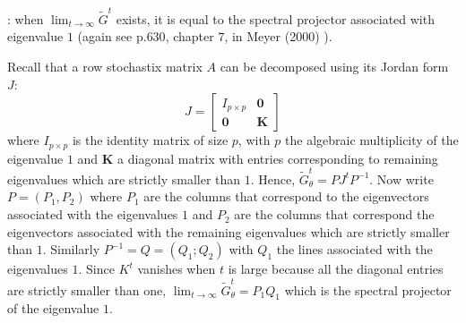 \documentclass{article}
\begin{document}
: when $\lim_{t \rightarrow \infty} \tilde{G}^t$ exists, it is equal to the spectral projector associated with eigenvalue $1$ (again see p.$630$, chapter $7$, in Meyer (2000) \cite{meyer}). 

\bigskip

 Recall that a row stochastix matrix $A$ can be decomposed using its Jordan form $J$:
\[ J= \begin{bmatrix}
I_{p \times p} & \mathbf{0} \\ \mathbf{0} & \mathbf{K}
\end{bmatrix}
\] 
\noindent where $I_{p \times p}$  is the identity matrix of size $p$, with $p$ the algebraic multiplicity  of the eigenvalue $1$ and $\mathbf{K}$ a diagonal matrix with entries corresponding to remaining eigenvalues which are strictly smaller than $1$. Hence, $\tilde{G}_{\theta}^t = P J^t P^{-1}$. Now write $P=(P_1 , P_2)$ where $P_1$ are the columns that correspond to the eigenvectors associated with the eigenvalues $1$ and $P_2$ are the columns that correspond the eigenvectors associated with the remaining eigenvalues which are strictly smaller than $1$. Similarly $P^{-1} = Q = (Q_1 ; Q_2)$ with $Q_1$ the lines associated with the eigenvalues $1$. Since $K^t$ vanishes when $t$ is large because all the diagonal entries are strictly smaller than one, $\lim_{t \rightarrow \infty }  \tilde{G}_{\theta}^t = P_1 Q_1$ which is the spectral projector of the eigenvalue $1$. \\ 
\end{document}
